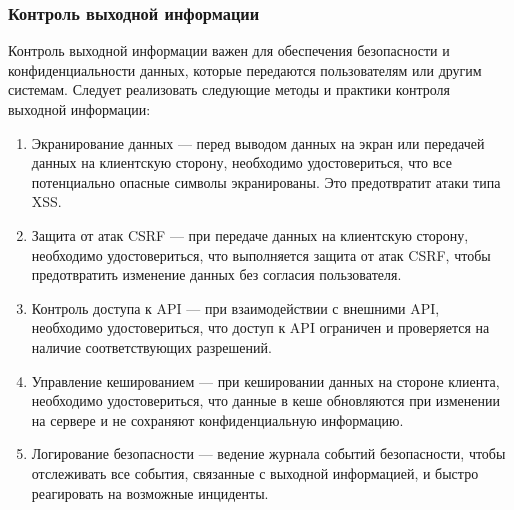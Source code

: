 \documentclass[a4paper,14pt]{extarticle}
\begin{document}
\begin{spacing}{1.5}
\subsubsection{Контроль выходной информации}
\hspace{\parindent} Контроль выходной информации важен для обеспечения безопасности и конфиденциальности данных, которые передаются пользователям или другим системам. Следует реализовать следующие методы и практики контроля выходной информации:
\begin{enumerate}
    \item Экранирование данных --- перед выводом данных на экран или передачей данных на клиентскую сторону, необходимо удостовериться, что все потенциально опасные символы экранированы. Это предотвратит атаки типа XSS.
    \item Защита от атак CSRF --- при передаче данных на клиентскую сторону, необходимо удостовериться, что выполняется защита от атак CSRF, чтобы предотвратить изменение данных без согласия пользователя.
    \item Контроль доступа к API --- при взаимодействии с внешними API, необходимо удостовериться, что доступ к API ограничен и проверяется на наличие соответствующих разрешений.
    \item Управление кешированием --- при кешировании данных на стороне клиента, необходимо удостовериться, что данные в кеше обновляются при изменении на сервере и не сохраняют конфиденциальную информацию.
    \item Логирование безопасности --- ведение журнала событий безопасности, чтобы отслеживать все события, связанные с выходной информацией, и быстро реагировать на возможные инциденты.
\end{enumerate}

\end{spacing}
\end{document}
